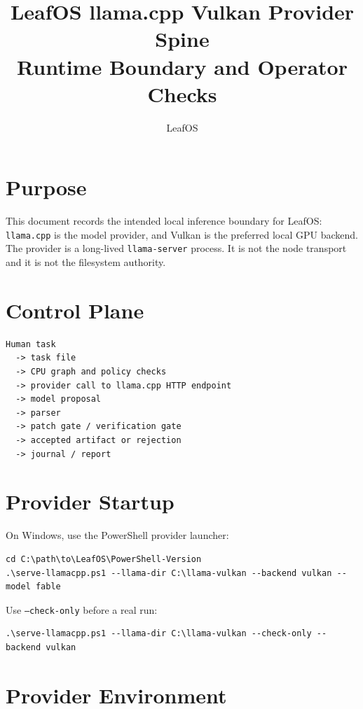 \documentclass[11pt]{article}
\title{\textbf{LeafOS llama.cpp Vulkan Provider Spine}\\[4pt]\large Runtime Boundary and Operator Checks}
\author{LeafOS}
\date{}
\newcommand{\code}[1]{\texttt{#1}}
\begin{document}
\maketitle

\section*{Purpose}

This document records the intended local inference boundary for LeafOS:
\code{llama.cpp} is the model provider, and Vulkan is the preferred local GPU
backend. The provider is a long-lived \code{llama-server} process. It is not the
node transport and it is not the filesystem authority.

\section*{Control Plane}

\begin{Verbatim}[fontsize=\small, frame=single]
Human task
  -> task file
  -> CPU graph and policy checks
  -> provider call to llama.cpp HTTP endpoint
  -> model proposal
  -> parser
  -> patch gate / verification gate
  -> accepted artifact or rejection
  -> journal / report
\end{Verbatim}

\section*{Provider Startup}

On Windows, use the PowerShell provider launcher:

\begin{Verbatim}[fontsize=\small, frame=single]
cd C:\path\to\LeafOS\PowerShell-Version
.\serve-llamacpp.ps1 --llama-dir C:\llama-vulkan --backend vulkan --model fable
\end{Verbatim}

Use \code{--check-only} before a real run:

\begin{Verbatim}[fontsize=\small, frame=single]
.\serve-llamacpp.ps1 --llama-dir C:\llama-vulkan --check-only --backend vulkan
\end{Verbatim}

\section*{Provider Environment}
\end{document}
